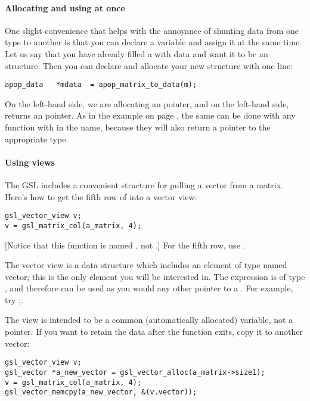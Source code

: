 \paragraph{Allocating and using at once}    
One slight convenience that helps with the annoyance of shunting data from
one type to another is that you can declare a variable and assign it at the
same time. Let us say that you have already filled a  with data and want it to be an  structure. Then
you can declare and allocate your new structure with one line:
\begin{lstlisting}
apop_data   *mdata  = apop_matrix_to_data(m);
\end{lstlisting}
On the left-hand side, we are allocating an  pointer, and
on the left-hand side,  returns an 
 pointer. As in the example on page \pageref{gslexample}, the same can be
done with any function with  in the name, because they will also
return a pointer to the appropriate type.

\paragraph{Using views}
The GSL includes a convenient structure for pulling a vector from a
matrix. Here's how to get the fifth row of  into a vector view:

\begin{lstlisting}
gsl_vector_view v;
v = gsl_matrix_col(a_matrix, 4);
\end{lstlisting}
[Notice that this function is named , not .]
For the fifth row, use . 

The vector view is a data structure which includes an element of type 
named vector; this is the only element you will be interested in. The
expression  is of type , and therefore can
be used as you would any other pointer to a . For example,
try ;.

The view is intended to be a common (automatically allocated) variable,
not a pointer. If you want to retain the data after the function exits,
copy it to another vector:

\begin{lstlisting}
gsl_vector_view v;
gsl_vector *a_new_vector = gsl_vector_alloc(a_matrix->size1);
v = gsl_matrix_col(a_matrix, 4);
gsl_vector_memcpy(a_new_vector, &(v.vector));
\end{lstlisting}

